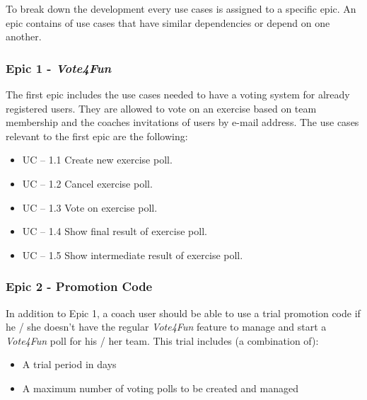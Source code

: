 To break down the development every use cases is assigned to a specific epic. An epic contains of use cases that have similar dependencies or depend on one another.

\subsubsection{Epic 1 - \textit{Vote4Fun}}
\label{sssec:epic1}

The first epic includes the use cases needed to have a voting system for already registered users. They are allowed to vote on an exercise based on team membership and the coaches invitations of users by e-mail address.
\newline
The use cases relevant to the first epic are the following:

\begin{itemize}
    \item UC – 1.1 
    \newline
    Create new exercise poll.
    \item UC – 1.2 
    \newline
    Cancel exercise poll.
    \item UC – 1.3 
    \newline
    Vote on exercise poll.
    \item UC – 1.4 
    \newline
    Show final result of exercise poll.
    \item UC – 1.5 
    \newline
    Show intermediate result of exercise poll.
\end{itemize}

\subsubsection{Epic 2 - Promotion Code}
\label{sssec:epic2}

In addition to Epic 1, a coach user should be able to use a trial promotion code if he / she doesn't have the regular \textit{Vote4Fun} feature to manage and start a \textit{Vote4Fun} poll for his / her team. 
\newline
This trial includes (a combination of):

\begin{itemize}
    \item A trial period in days
    \item A  maximum number of  voting polls to be created and managed
\end{itemize}

